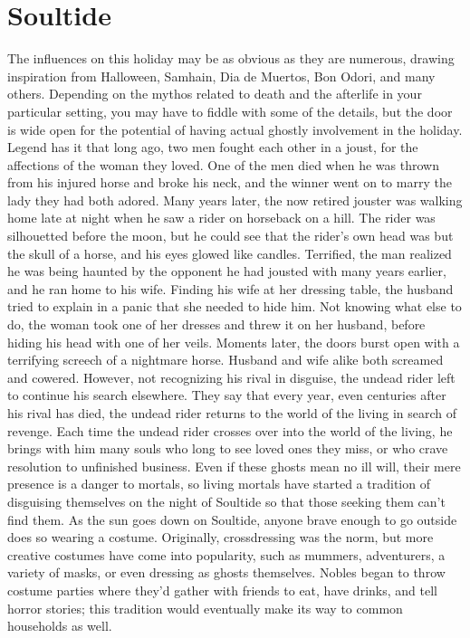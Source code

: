 \documentclass[10pt,a4paper,twoside,bg=print,twocolumn,openany,nodeprecatedcode]{dndbook}
\begin{document}
\section{Soultide}
The influences on this holiday may be as obvious as they are numerous, drawing inspiration from Halloween, Samhain, Dia de Muertos, Bon Odori, and many others. Depending on the mythos related to death and the afterlife in your particular setting, you may have to fiddle with some of the details, but the door is wide open for the potential of having actual ghostly involvement in the holiday.
Legend has it that long ago, two men fought each other in a joust, for the affections of the woman they loved. One of the men died when he was thrown from his injured horse and broke his neck, and the winner went on to marry the lady they had both adored. Many years later, the now retired jouster was walking home late at night when he saw a rider on horseback on a hill. The rider was silhouetted before the moon, but he could see that the rider's own head was but the skull of a horse, and his eyes glowed like candles.
Terrified, the man realized he was being haunted by the opponent he had jousted with many years earlier, and he ran home to his wife. Finding his wife at her dressing table, the husband tried to explain in a panic that she needed to hide him. Not knowing what else to do, the woman took one of her dresses and threw it on her husband, before hiding his head with one of her veils. Moments later, the doors burst open with a terrifying screech of a nightmare horse. Husband and wife alike both screamed and cowered. However, not recognizing his rival in disguise, the undead rider left to continue his search elsewhere. They say that every year, even centuries after his rival has died, the undead rider returns to the world of the living in search of revenge. Each time the undead rider crosses over into the world of the living, he brings with him many souls who long to see loved ones they miss, or who crave resolution to unfinished business. Even if these ghosts mean no ill will, their mere presence is a danger to mortals, so living mortals have started a tradition of disguising themselves on the night of Soultide so that those seeking them can't find them.
As the sun goes down on Soultide, anyone brave enough to go outside does so wearing a costume. Originally, crossdressing was the norm, but more creative costumes have come into popularity, such as mummers, adventurers, a variety of masks, or even dressing as ghosts themselves. Nobles began to throw costume parties where they'd gather with friends to eat, have drinks, and tell horror stories; this tradition would eventually make its way to common households as well.
\end{document}

